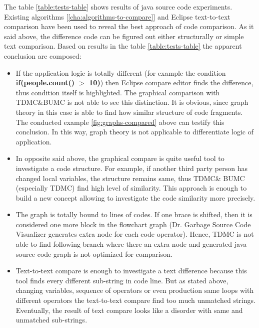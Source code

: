 \documentclass{report}
\begin{document}
The table \ref{table:tests-table} shows results of java source code experiments. Existing algorithms [\ref{cha:algorithms-to-compare}] and Eclipse text-to-text comparison have been used to reveal the best approach of code comparison. As it said above, the difference code can be figured out either structurally or simple text comparison. Based on results in the table \ref{table:tests-table} the apparent conclusion are composed:
\begin{itemize}
	\item If the application logic is totally different (for example the condition \\ \textbf{if(people.count() $>$ 10)}) then Eclipse compare editor finds the difference, thus condition itself is highlighted. The graphical comparison with  TDMC\&BUMC  is not able to see this distinction. It is obvious, since graph theory in this case is able to find how similar structure of code fragments. The conducted example \ref{fig:graphs-compared} above can testify this conclusion. In this way, graph theory is not applicable to differentiate logic of application.
	
	\item In opposite said above, the graphical compare is quite useful tool to investigate a code structure. For example, if another third party person has changed local variables, the structure remains same, thus TDMC\& BUMC (especially TDMC) find high level of similarity. This approach is enough to build a new concept allowing to investigate the code similarity more precisely. 
	
	\item The graph is totally bound to lines of codes. If one brace is shifted, then it is considered one more block in the flowchart graph (Dr. Garbage Source Code Visualizer \cite{drgarbage} generates extra node for each code operator). Hence, TDMC is not able to find following branch where there an extra node and generated java source code graph is not optimized for comparison.
	
	\item Text-to-text compare is enough to investigate a text difference because this tool finds every different sub-string in code line. But as stated above, changing variables, sequence of operators or even production same loops with different operators the text-to-text compare find too much unmatched strings. Eventually, the result of text compare looks like a disorder with same and unmatched sub-strings.  	

\end{itemize}
\end{document}
